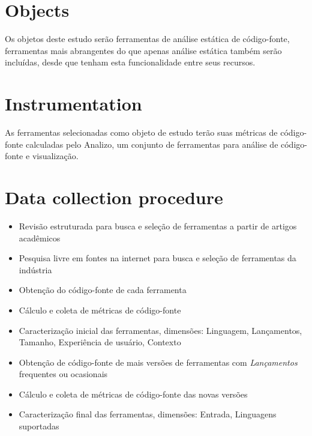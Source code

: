 \section{Objects}

Os objetos deste estudo serão ferramentas de análise estática de código-fonte,
ferramentas mais abrangentes do que apenas análise estática também serão
incluídas, desde que tenham esta funcionalidade entre seus recursos.

\section{Instrumentation}

As ferramentas selecionadas como objeto de estudo terão suas métricas de
código-fonte calculadas pelo Analizo, um conjunto de ferramentas para análise
de código-fonte e visualização.


\section{Data collection procedure}

\begin{itemize}
  \item Revisão estruturada para busca e seleção de ferramentas a partir de artigos acadêmicos
  \item Pesquisa livre em fontes na internet para busca e seleção de ferramentas da indústria
  \item Obtenção do código-fonte de cada ferramenta
  \item Cálculo e coleta de métricas de código-fonte
  \item Caracterização inicial das ferramentas, dimensões: Linguagem, Lançamentos, Tamanho, Experiência de usuário, Contexto
  \item Obtenção de código-fonte de mais versões de ferramentas com {\it Lançamentos} frequentes ou ocasionais
  \item Cálculo e coleta de métricas de código-fonte das novas versões
  \item Caracterização final das ferramentas, dimensões: Entrada, Linguagens suportadas
\end{itemize}

